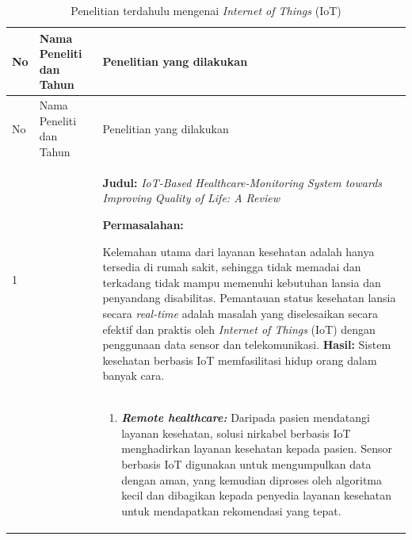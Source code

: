 \begin{longtable}[!h]
    {
        p{}
        p{}
        p{}
    }
    \caption{Penelitian terdahulu mengenai \textit{Internet of Things} (IoT)}\\

    \hline
        No &
        Nama Peneliti dan Tahun &
        Penelitian yang dilakukan \\ [0.5ex]
    \hline

    \endfirsthead


    \hline
        No &
        Nama Peneliti dan Tahun &
        Penelitian yang dilakukan \\ [0.5ex]
    \hline
    \endhead %
    \hline

    \endfoot
    \hline
    \endlastfoot

        1
        & \textcite{inproc:abdulmalek}
        &
        \textbf{Judul:}
        \textit{IoT-Based Healthcare-Monitoring System towards Improving Quality of Life: A Review}

        \textbf{Permasalahan:}

        Kelemahan utama dari layanan kesehatan adalah hanya tersedia di rumah sakit, sehingga tidak memadai dan terkadang tidak mampu memenuhi kebutuhan lansia dan penyandang disabilitas. Pemantauan status kesehatan lansia secara \textit{real-time} adalah masalah yang diselesaikan secara efektif dan praktis oleh \textit{Internet of Things} (IoT) dengan penggunaan data sensor dan telekomunikasi.
        \textbf{Hasil:}
        Sistem kesehatan berbasis IoT memfasilitasi hidup orang dalam banyak cara.

        \\
        & &

        \begin{enumerate}
            \item \textbf{\textit{Remote healthcare:}}
            Daripada pasien mendatangi layanan kesehatan, solusi nirkabel berbasis IoT menghadirkan layanan kesehatan kepada pasien. Sensor berbasis IoT digunakan untuk mengumpulkan data dengan aman, yang kemudian diproses oleh algoritma kecil dan dibagikan kepada penyedia layanan kesehatan untuk mendapatkan rekomendasi yang tepat.


\end{enumerate}
\end{longtable}
